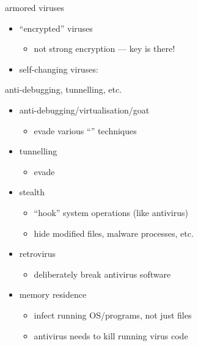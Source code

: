 
\begin{frame}{armored viruses}
    \begin{itemize}
    \item ``encrypted'' viruses
        \begin{itemize}
        \item not strong encryption --- key is there!
        \end{itemize}
    \item self-changing viruses:
    \end{itemize}
\end{frame}

\begin{frame}{anti-debugging, tunnelling, etc.}
    \begin{itemize}
    \item anti-debugging/virtualisation/goat
        \begin{itemize}
        \item evade various ``'' techniques
        \end{itemize}
    \item tunnelling
        \begin{itemize}
        \item evade 
        \end{itemize}
    \item stealth
        \begin{itemize}
        \item ``hook'' system operations (like antivirus)
        \item hide modified files, malware processes, etc.
        \end{itemize}
    \item retrovirus
        \begin{itemize}
        \item deliberately break antivirus software
        \end{itemize}
    \item memory residence
        \begin{itemize}
        \item infect running OS/programs, not just files
        \item antivirus needs to kill running virus code
        \end{itemize}
    \end{itemize}
\end{frame}

